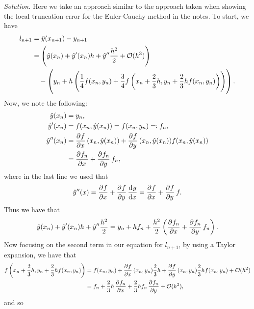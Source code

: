 \documentclass{article}
\newcommand{\Oh}{\mathcal{O}}
\begin{document}
\textit{Solution.}
Here we take an approach similar to the approach taken when showing the local truncation error for the Euler-Cauchy
method in the notes. To start, we have
%
\begin{align*}
    l_{n + 1}
        &= \hat{y}(x_{n + 1}) - y_{n + 1} \\
        &= \del{\hat{y}(x_{n}) + \hat{y}^\prime(x_n)h + \hat{y}^{\prime \prime} \frac{h^2}{2} + \Oh(h^3)}
            \\
        &\quad-
            \del{y_{n} + h \del{\frac{1}{4} f(x_n, y_n) + \frac{3}{4} f\del{x_n + \frac{2}{3} h, y_n + \frac{2}{3}h f(x_n, y_n)}}}
            .
\end{align*}
%
Now, we note the following:
%
\begin{align*}
    \hat{y}(x_n) &= y_n,
    \\
    \hat{y}^\prime(x_n) &= f(x_n, \hat{y}(x_n)) = f(x_n, y_n) \eqqcolon f_n,
    \\
    \hat{y}^{\prime \prime}(x_n)
        &= \dpd{f}{x} (x_n, \hat{y}(x_n))
        + \dpd{f}{y} (x_n, \hat{y}(x_n))
        f(x_n, \hat{y}(x_n))
        \\
        &= \dpd{f_n}{x}
        + \dpd{f_n}{y} f_n
        ,
\end{align*}
%
where in the last line we used that
%
\begin{equation*}
    \hat{y}^{\prime \prime}(x)
        = \dpd{f}{x} + \dpd{f}{y} \dod{y}{x}
        = \dpd{f}{x} + \dpd{f}{y} f
        .
\end{equation*}
%
Thus we have that
%
\begin{equation*}
    \hat{y}(x_{n}) + \hat{y}^\prime(x_n)h + \hat{y}^{\prime \prime} \frac{h^2}{2}
    = y_n + h f_n + \frac{h^2}{2} \del{\dpd{f_n}{x} + \dpd{f_n}{y} f_n}
    .
\end{equation*}
%
Now focusing on the second term in our equation for $l_{n + 1}$, by
using a Taylor expansion, we have that
%
\begin{align*}
    f\del{x_n + \frac{2}{3} h, y_n + \frac{2}{3}h f(x_n, y_n)}
        &= f(x_n, y_n)
            + \dpd{f}{x} (x_n, y_n) \frac{2}{3} h
            + \dpd{f}{y} (x_n, y_n) \frac{2}{3} h f(x_n, y_n)
            + \Oh(h^2)
            \\
        &= f_n
            + \frac{2}{3} h \dpd{f_n}{x}
            + \frac{2}{3} h f_n \dpd{f_n}{y}
            + \Oh(h^2)
            ,
\end{align*}
%
and so
%
\end{document}
